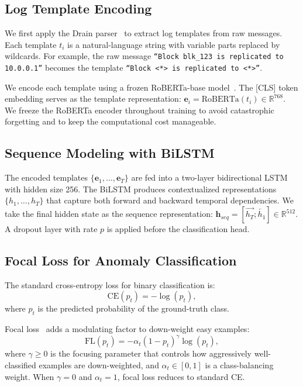 \documentclass[conference]{IEEEtran}
\begin{document}
\subsection{Log Template Encoding}\label{sec:encoding}

We first apply the Drain parser~\cite{he2017drain} to extract log templates from raw messages.
Each template $t_i$ is a natural-language string with variable parts replaced by wildcards.
For example, the raw message \texttt{``Block blk\_123 is replicated to 10.0.0.1''}
becomes the template \texttt{``Block <*> is replicated to <*>''}.

We encode each template using a frozen RoBERTa-base model~\cite{liu2019roberta}.
The [CLS] token embedding serves as the template representation:
$\mathbf{e}_i = \text{RoBERTa}(t_i) \in \mathbb{R}^{768}$.
We freeze the RoBERTa encoder throughout training to avoid catastrophic forgetting
and to keep the computational cost manageable.

\subsection{Sequence Modeling with BiLSTM}\label{sec:bilstm}

The encoded templates $\{\mathbf{e}_1, \ldots, \mathbf{e}_T\}$ are fed into a two-layer
bidirectional LSTM with hidden size 256.
The BiLSTM produces contextualized representations $\{h_1, \ldots, h_T\}$
that capture both forward and backward temporal dependencies.
We take the final hidden state as the sequence representation:
$\mathbf{h}_{seq} = [\overrightarrow{h_T}; \overleftarrow{h_1}] \in \mathbb{R}^{512}$.
A dropout layer with rate $p$ is applied before the classification head.

\subsection{Focal Loss for Anomaly Classification}\label{sec:focal}

The standard cross-entropy loss for binary classification is:
\begin{equation}
\text{CE}(p_t) = -\log(p_t),
\label{eq:ce}
\end{equation}
where $p_t$ is the predicted probability of the ground-truth class.

Focal loss~\cite{lin2017focal} adds a modulating factor to down-weight easy examples:
\begin{equation}
\text{FL}(p_t) = -\alpha_t (1 - p_t)^\gamma \log(p_t),
\label{eq:focal}
\end{equation}
where $\gamma \geq 0$ is the focusing parameter that controls how aggressively
well-classified examples are down-weighted,
and $\alpha_t \in [0, 1]$ is a class-balancing weight.
When $\gamma = 0$ and $\alpha_t = 1$, focal loss reduces to standard CE.
\end{document}
